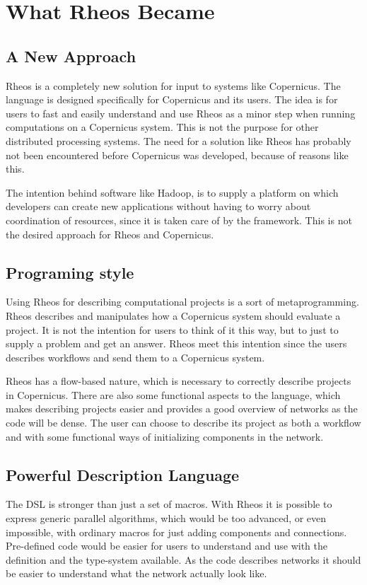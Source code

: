 \section{What Rheos Became}

\subsection{A New Approach}
Rheos is a completely new solution for input to systems like
Copernicus. The language is designed specifically for Copernicus and
its users. The idea is for users to fast and easily understand and use
Rheos as a minor step when running computations on a Copernicus
system. This is not the purpose for other distributed processing
systems. The need for a solution like Rheos has probably not been
encountered before Copernicus was developed, because of reasons like
this.

The intention behind software like Hadoop, is to supply a platform on
which developers can create new applications without having to worry
about coordination of resources, since it is taken care of by the
framework. This is not the desired approach for Rheos and Copernicus.

\subsection{Programing style}
Using Rheos for describing computational projects is a sort of
metaprogramming. Rheos describes and manipulates how a Copernicus
system should evaluate a project. It is not the intention for users
to think of it this way, but to just to supply a problem and get an
answer. Rheos meet this intention since the users describes workflows
and send them to a Copernicus system.

Rheos has a flow-based nature, which is necessary to correctly
describe projects in Copernicus. There are also some functional
aspects to the language, which makes describing projects easier and
provides a good overview of networks as the code will be dense. The
user can choose to describe its project as both a workflow and with
some functional ways of initializing components in the network.


\subsection{Powerful Description Language}
The DSL is stronger than just a set of macros. With Rheos it is
possible to express generic parallel algorithms, which would be too
advanced, or even impossible, with ordinary macros for just adding
components and connections. Pre-defined code would be easier for users
to understand and use with the definition and the type-system
available. As the code describes networks it should be easier to
understand what the network actually look like.

